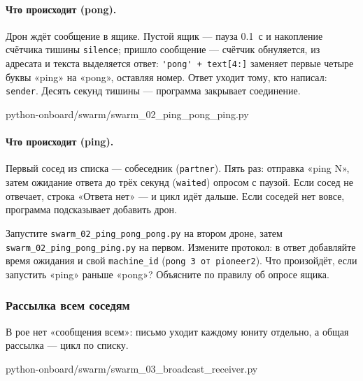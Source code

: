 \paragraph{Что происходит (pong).} Дрон ждёт сообщение в ящике. Пустой ящик --- пауза 0.1~с и накопление счётчика тишины \verb|silence|; пришло сообщение --- счётчик обнуляется, из адресата и текста выделяется ответ: \verb|'pong' + text[4:]| заменяет первые четыре буквы «ping» на «pong», оставляя номер. Ответ уходит тому, кто написал: \verb|sender|. Десять секунд тишины --- программа закрывает соединение.

\begin{codefile}[python]{python-onboard/swarm/swarm_02_ping_pong_ping.py}
\end{codefile}

\paragraph{Что происходит (ping).} Первый сосед из списка --- собеседник (\verb|partner|). Пять раз: отправка «ping N», затем ожидание ответа до трёх секунд (\verb|waited|) опросом с паузой. Если сосед не отвечает, строка «Ответа нет» --- и цикл идёт дальше. Если соседей нет вовсе, программа подсказывает добавить дрон.

\begin{taskbox}
Запустите \texttt{swarm\_02\_ping\_pong\_pong.py} на втором дроне, затем \texttt{swarm\_02\_ping\_pong\_ping.py} на первом. Измените протокол: в ответ добавляйте время ожидания и свой \texttt{machine\_id} (\texttt{pong 3 от pioneer2}). Что произойдёт, если запустить «ping» раньше «pong»? Объясните по правилу об опросе ящика.
\end{taskbox}

\subsubsection*{Рассылка всем соседям}

В рое нет «сообщения всем»: письмо уходит каждому юниту отдельно, а общая рассылка --- цикл по списку.

\begin{codefile}[python]{python-onboard/swarm/swarm_03_broadcast_receiver.py}
\end{codefile}

